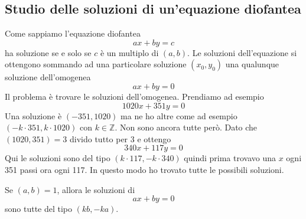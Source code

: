 \subsection{Studio delle soluzioni di un'equazione diofantea}
Come sappiamo l'equazione diofantea
\begin{equation*}
	ax + by = c
\end{equation*}
ha soluzione se e solo se $c$ \`e un multiplo di $(a, b)$. Le soluzioni dell'equazione si
ottengono sommando ad una particolare soluzione $(x_0, y_0)$ una qualunque soluzione
dell'omogenea
\begin{equation*}
	ax + by = 0
\end{equation*}
Il problema \`e trovare le soluzioni dell'omogenea.
Prendiamo ad esempio
\begin{equation*}
	1020x + 351y = 0
\end{equation*}
Una soluzione \`e $(-351, 1020)$ ma ne ho altre come ad esempio $(-k \cdot 351, k \cdot 1020)$
con $k \in \mathbb{Z}$.
Non sono ancora tutte per\`o. Dato che $(1020, 351) = 3$ divido tutto per 3 e ottengo
\begin{equation*}
	340x + 117y = 0
\end{equation*}
Qui le soluzioni sono del tipo $(k \cdot 117, -k \cdot 340)$ quindi prima trovavo una $x$ ogni
351 passi ora ogni 117. In questo modo ho trovato tutte le possibili soluzioni.

\begin{theorem}
	Se $(a, b) = 1$, allora le soluzioni di
	\begin{equation*}
		ax + by = 0
	\end{equation*}
	sono tutte del tipo $(kb, -ka)$.
\end{theorem}
